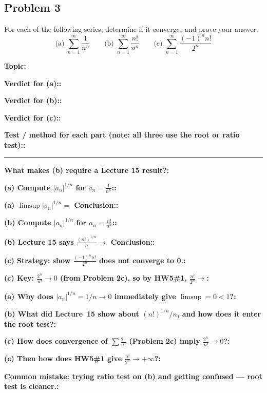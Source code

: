 \documentclass[12pt]{article}
\newcommand{\fillfield}[1]{%
  \par\noindent\textbf{#1:}\enspace\hrulefill\par\vspace{3pt}%
}
\newcommand{\fillfieldlong}[1]{%
  \par\noindent\textbf{#1:}\par\vspace{1.5cm}%
  \noindent\rule{\linewidth}{0.35pt}\par\vspace{4pt}%
}
\begin{document}
\subsection{Problem 3}

\begin{tcolorbox}[
  enhanced, breakable,
  colback  = probblue,
  colframe = blue!55!black,
  fonttitle = \bfseries,
  title = {\textsc{Problem Statement}\hfill Homework 7, Problem 3}
]
For each of the following series, determine if it converges and prove your answer.
\[
  \text{(a)}\;\sum_{n=1}^{\infty}\frac{1}{n^n}
  \qquad
  \text{(b)}\;\sum_{n=1}^{\infty}\frac{n!}{n^n}
  \qquad
  \text{(c)}\;\sum_{n=1}^{\infty}\frac{(-1)^n n!}{2^n}
\]
\end{tcolorbox}

\bigskip

\begin{tcolorbox}[
  enhanced, breakable,
  colback  = pass1green,
  colframe = green!55!black,
  fonttitle = \bfseries,
  title = {Pass 1 \enspace\textbf{--}\enspace First Diagnosis}
]
\fillfield{Topic}
\fillfield{Verdict for (a):}
\fillfield{Verdict for (b):}
\fillfield{Verdict for (c):}
\fillfieldlong{Test / method for each part (note: all three use the root or ratio test):}
\fillfield{What makes (b) require a Lecture 15 result?}
\end{tcolorbox}

\bigskip

\begin{tcolorbox}[
  enhanced, breakable,
  colback  = pass2yellow,
  colframe = yellow!65!black,
  fonttitle = \bfseries,
  title = {Pass 2 \enspace\textbf{--}\enspace Proof Recipe Card}
]
\fillfield{(a) Compute $|a_n|^{1/n}$ for $a_n = \frac{1}{n^n}$:}
\fillfield{(a) $\limsup|a_n|^{1/n}=$\hspace{1cm} Conclusion:}
\fillfield{(b) Compute $|a_n|^{1/n}$ for $a_n = \frac{n!}{n^n}$:}
\fillfield{(b) Lecture 15 says $\frac{(n!)^{1/n}}{n} \to$\hspace{1cm} Conclusion:}
\fillfield{(c) Strategy: show $\frac{(-1)^n n!}{2^n}$ does not converge to 0.}
\fillfield{(c) Key: $\frac{2^n}{n!} \to 0$ (from Problem 2c), so by HW5\#1, $\frac{n!}{2^n} \to$}
\end{tcolorbox}

\bigskip

\begin{tcolorbox}[
  enhanced, breakable,
  colback  = pass3orange,
  colframe = orange!65!black,
  fonttitle = \bfseries,
  title = {Pass 3 \enspace\textbf{--}\enspace Self-Explanation}
]
\fillfield{(a) Why does $|a_n|^{1/n} = 1/n \to 0$ immediately give $\limsup = 0 < 1$?}
\fillfield{(b) What did Lecture~15 show about $(n!)^{1/n}/n$, and how does it enter the root test?}
\fillfield{(c) How does convergence of $\sum \frac{2^n}{n!}$ (Problem 2c) imply $\frac{2^n}{n!} \to 0$?}
\fillfield{(c) Then how does HW5\#1 give $\frac{n!}{2^n} \to +\infty$?}
\fillfield{Common mistake: trying ratio test on (b) and getting confused — root test is cleaner.}
\end{tcolorbox}
\end{document}
